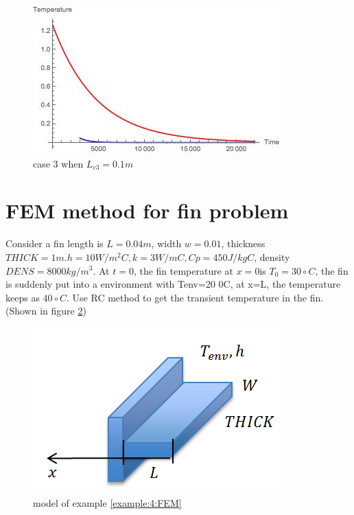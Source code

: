 \begin{solution}
\begin{figure}[H]
  \centering
    \includegraphics[scale=0.8]{figures/ch4/4}
    \caption{case 3 when $L_{c3}=0.1 m$}
    \label{fig:4:4}
\end{figure}
\end{solution}

\section{FEM method for fin problem}
\begin{example}
\label{example:4:FEM}
Consider a fin length is $L = 0.04 m$, width $w = 0.01$, thickness $THICK = 1 m. h = 10 W/m^2 C, k = 3 W/mC, Cp = 450 J/kg C$,
density $DENS = 8000 kg/m^3$. At $t=0$, the fin temperature at $x=0 $is $T_0=30\circ C$,
the fin is suddenly put into a environment with Tenv=20 0C, at x=L, the temperature keeps as $40\circ C$.
Use RC method to get the transient temperature in the fin. (Shown in figure \ref{fig:4:5})
\begin{figure}[H]
  \centering
    \includegraphics[scale=0.8]{figures/ch4/5}
    \caption{model of example \ref{example:4:FEM}}
    \label{fig:4:5}
\end{figure}
\end{example}

